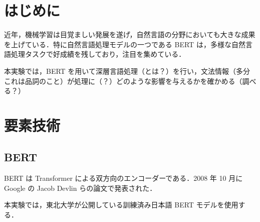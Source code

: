 \documentclass[twocolumn]{jarticle}
\begin{document}

\section{はじめに}
近年，機械学習は目覚ましい発展を遂げ，自然言語の分野においても大きな成果を上げている．特に自然言語処理モデルの一つである BERT は，多様な自然言語処理タスクで好成績を残しており，注目を集めている．
\par
本実験では，BERT を用いて深層言語処理（とは？）を行い，文法情報（多分これは品詞のこと）が処理に（？）どのような影響を与えるかを確かめる（調べる？）

\section{要素技術}

  \subsection{BERT}
  BERT \cite{DBLP} は Transformer による双方向のエンコーダーである．2008 年 10 月に Google の Jacob Devlin らの論文で発表された．
  \par
  本実験では，東北大学が公開している訓練済み日本語 BERT モデルを使用する．
  \par
\end{document}
